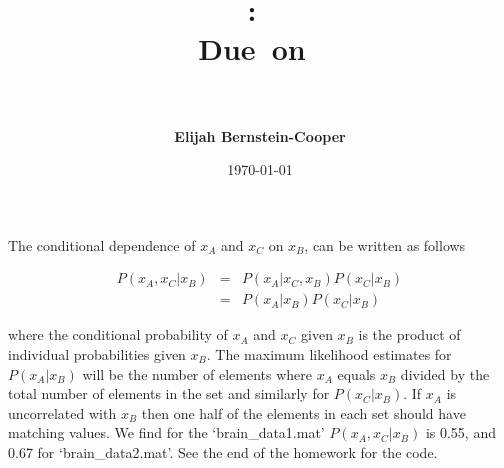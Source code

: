 \documentclass{article}
\title{\vspace{0in}
    \textmd{\textbf{\hmwkClass:\ \hmwkTitle}}\\
    \normalsize\vspace{0.1in}\small{Due\ on\ \hmwkDueDate}\\
    \vspace{0.1in}\large{\textit{\hmwkClassInstructor\ \hmwkClassTime}}
    \vspace{0.5in}}
\author{\textbf{Elijah Bernstein-Cooper}}
\date{\today} %
\begin{document}
\maketitle

\begin{homeworkProblem}


    The conditional dependence of $x_A$ and $x_C$ on $x_B$, can be written
    as follows 
    
    \begin{eqnarray*}
        P(x_A, x_C | x_B) & = & P(x_A | x_C, x_B) P(x_C | x_B) \\
                          & = & P(x_A | x_B) P(x_C | x_B)
    \end{eqnarray*}

    \noindent where the conditional probability of $x_A$ and $x_C$ given $x_B$
    is the product of individual probabilities given $x_B$. The maximum
    likelihood estimates for $P(x_A | x_B)$ will be the number of elements
    where $x_A$ equals $x_B$ divided by the total number of elements in the set
    and similarly for $P(x_C | x_B)$. If $x_A$ is uncorrelated with $x_B$ then
    one half of the elements in each set should have matching values. We find
    for the `brain\_data1.mat' $P(x_A, x_C | x_B)$ is 0.55, and 0.67 for
    `brain\_data2.mat'. See the end of the homework for the code.

\end{homeworkProblem}
\end{document}
